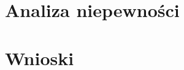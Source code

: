 \documentclass[a4paper,10pt]{article}
\begin{document}
\section{Analiza niepewności}

\section{Wnioski}
\end{document}
